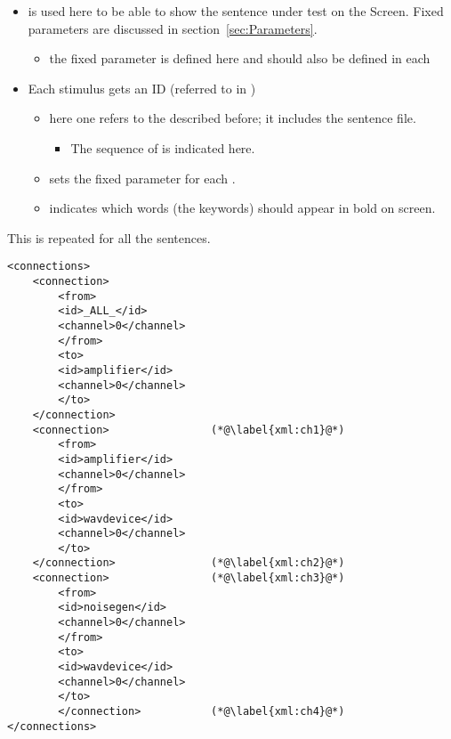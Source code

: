 \begin{itemize}
\item {} is used here to be able to show
the sentence under test on the Screen. Fixed parameters are
discussed in section~\ref{sec:Parameters}.


\begin{itemize}
\item {} the fixed parameter is defined here and
should also be defined in each 
\end{itemize}

\item {} Each stimulus gets an ID (referred to in
)
\begin{itemize}

\item {} here one refers to the
 described before; it includes the sentence
file.

\begin{itemize}
\item {} The sequence of  is
indicated here.
\end{itemize}

\item {} sets the fixed parameter for each
.

\item {} indicates which words (the keywords) should
appear in bold on screen.
\end{itemize}
\end{itemize}

This is repeated for all the sentences.









\begin{lstlisting}
<connections>
    <connection>
        <from>
        <id>_ALL_</id>
        <channel>0</channel>
        </from>
        <to>
        <id>amplifier</id>
        <channel>0</channel>
        </to>
    </connection>
    <connection>                (*@\label{xml:ch1}@*)
        <from>
        <id>amplifier</id>
        <channel>0</channel>
        </from>
        <to>
        <id>wavdevice</id>
        <channel>0</channel>
        </to>
    </connection>               (*@\label{xml:ch2}@*)
    <connection>                (*@\label{xml:ch3}@*)
        <from>
        <id>noisegen</id>
        <channel>0</channel>
        </from>
        <to>
        <id>wavdevice</id>
        <channel>0</channel>
        </to>
        </connection>           (*@\label{xml:ch4}@*)
</connections>
\end{lstlisting}

